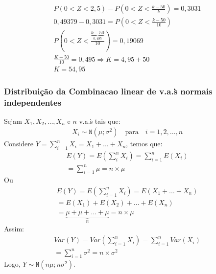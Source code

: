 \documentclass[11pt,a4paper]{book}
\begin{document}
\begin{description}
\begin{description}
\begin{description}
\begin{enumerate}[label=(\alph*)]
    \begin{align*}
      P(0 < Z < 2,5)  - P(0 < Z  < \frac{k-50}{k})=0,3031 \\
      0,49379 - 0,3031 = P(0 < Z < \frac{k-50}{10}) \\
      P(0<Z < \frac{\underbrace{k-50}_{0,495}}{10})= 0,19069  \\
      \frac{K-50}{10}= 0,495 \Rightarrow  K=4,95 +50 \\
      K=54,95
    \end{align*}
\end{enumerate}

    \end{description}
  \end{description}
  \subsubsection{Distribuição da Combinacao linear de v.a.\`s normais independentes}
  \begin{description}
    \item Sejam $X_1, X_2 , \ldots, X_n $ e  $n$ v.a.\`s tais que:
  \begin{align*}
    X_i \sim \mathtt{N}(\mu ; \sigma^2)  \quad \text{para} \quad i=1,2,\ldots,n
  \end{align*}
  Considere $Y= \sum_{i=1}^{n} X_i = X_1+\ldots+X_n$, temos que:
  \begin{align*}
    E(Y)  = E( \sum_{i}^{n} X_i ) = \sum_{i=1}^{n} E(X_i) \\
    = \sum_{i=1}^{n} \mu = n \times \mu
  \end{align*}
  Ou
  \begin{align*}
    E(Y )  =E( \sum_{i=1}^n X_i )= E(X_1 + \ldots +X_n) \\
    = E(X_1) +E(X_2) + \ldots +E(X_n)\\
    =\underbrace{\mu + \mu + \dots + \mu}_{n} = n \times \mu
  \end{align*}
  Assim:
  \begin{align*}
    Var(Y) = Var(\sum_{i=1}^{n} X_i)= \sum^{n}_{i=1} Var(X_i) \\
    = \sum_{i=1}^{n} \sigma^2 = n  \times \sigma^2
  \end{align*}
  Logo, $Y \sim \mathtt{N}(n\mu ; n \sigma^2)$.


\end{description}
\end{description}
\end{document}
